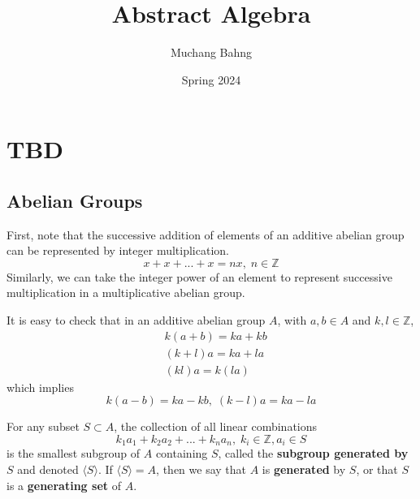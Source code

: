 \documentclass{article}
\begin{document}
\title{Abstract Algebra}
\author{Muchang Bahng}
\date{Spring 2024}

\maketitle
\tableofcontents
\pagebreak 



















\section{TBD} 

\subsection{Abelian Groups}

  First, note that the successive addition of elements of an additive abelian group can be represented by integer multiplication. 
  \begin{equation}
    x + x + ... + x = n x, \; n \in \mathbb{Z}
  \end{equation}
  Similarly, we can take the integer power of an element to represent successive multiplication in a multiplicative abelian group. 

  \begin{lemma}
    It is easy to check that in an additive abelian group $A$, with $a, b \in A$ and $k, l \in \mathbb{Z}$, 
    \begin{align}
      & k (a + b) = k a + k b \\
      & (k + l) a = k a + l a \\
      & (k l) a = k (l a)
    \end{align}
    which implies
    \begin{equation}
      k(a - b) = k a - k b, \; (k - l) a = k a - l a
    \end{equation}
  \end{lemma}

  \begin{definition}
    For any subset $S \subset A$, the collection of all linear combinations 
    \begin{equation}
      k_1 a_1 + k_2 a_2 + ... + k_n a_n, \; k_i \in \mathbb{Z}, a_i \in S
    \end{equation}
    is the smallest subgroup of $A$ containing $S$, called the \textbf{subgroup generated by $S$} and denoted $\langle S \rangle$. If $\langle S \rangle = A$, then we say that $A$ is \textbf{generated} by $S$, or that $S$ is a \textbf{generating set} of $A$. 
  \end{definition}
\end{document}
